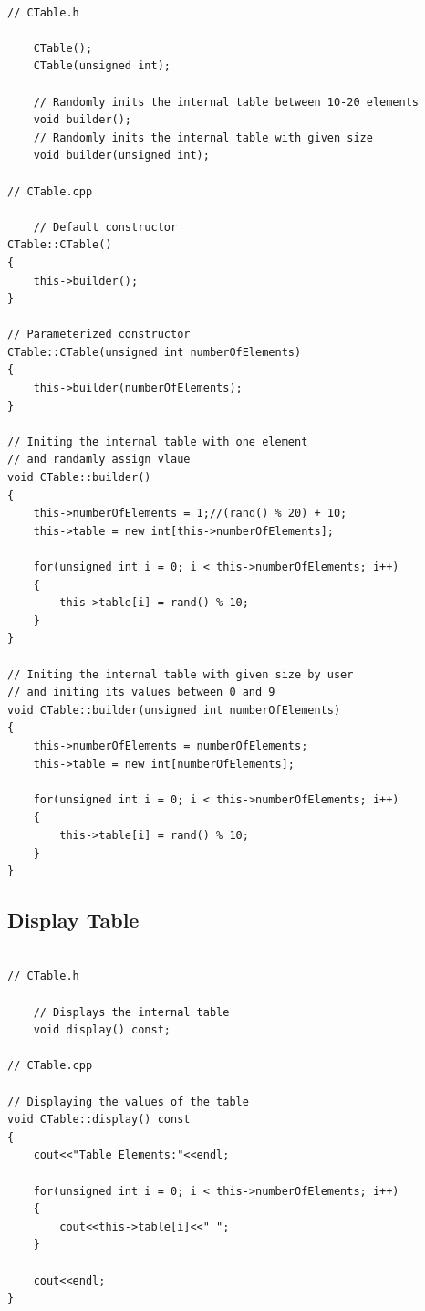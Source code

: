 \documentclass{article}
\begin{document}
	\begin{lstlisting}[label=CTable-builder, caption=Builder function]
	
// CTable.h
	
    CTable();
    CTable(unsigned int);

    // Randomly inits the internal table between 10-20 elements
    void builder();
    // Randomly inits the internal table with given size
    void builder(unsigned int);
    
// CTable.cpp
    
    // Default constructor
CTable::CTable()
{
    this->builder();
}

// Parameterized constructor
CTable::CTable(unsigned int numberOfElements)
{
    this->builder(numberOfElements);
}

// Initing the internal table with one element
// and randamly assign vlaue
void CTable::builder()
{
    this->numberOfElements = 1;//(rand() % 20) + 10;
    this->table = new int[this->numberOfElements];

    for(unsigned int i = 0; i < this->numberOfElements; i++)
    {
        this->table[i] = rand() % 10;
    }
}

// Initing the internal table with given size by user
// and initing its values between 0 and 9
void CTable::builder(unsigned int numberOfElements)
{
    this->numberOfElements = numberOfElements;
    this->table = new int[numberOfElements];

    for(unsigned int i = 0; i < this->numberOfElements; i++)
    {
        this->table[i] = rand() % 10;
    }
}

	\end{lstlisting}
	
	
	\subsection{Display Table}
	
	\begin{lstlisting}[label=CTable-display, caption=Display function]
	
// CTable.h
	
    // Displays the internal table
    void display() const;
    
// CTable.cpp
    
// Displaying the values of the table
void CTable::display() const
{
    cout<<"Table Elements:"<<endl;

    for(unsigned int i = 0; i < this->numberOfElements; i++)
    {
        cout<<this->table[i]<<" ";
    }

    cout<<endl;
}

	\end{lstlisting}
	
\end{document}
